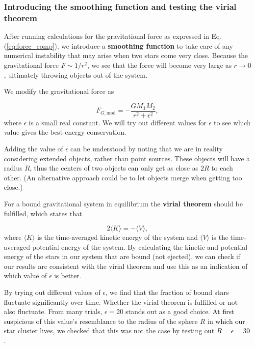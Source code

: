 \documentclass{article}
\begin{document}
\begin{multicols}{2}
\subsubsection{Introducing the smoothing function and testing the virial theorem}

After running calculations for the gravitational force as expressed in Eq. (\ref{eq:force_comp}), we introduce a \textbf{smoothing function} to take care of any numerical instability that may arise when two stars come very close. Because the gravitational force $F \sim 1/r^2$, we see that the force will become very large as $r \rightarrow 0$, ultimately throwing objects out of the system. 

We modify the gravitational force as

\begin{equation}\label{eq:force_mod}
	F_{G,\mathrm{mod}} = - \frac{G M_1 M_2}{r^2 + \epsilon^2},
\end{equation}
where $\epsilon$ is a small real constant. We will try out different values for $\epsilon$ to see which value gives the best energy conservation.

Adding the value of $\epsilon$ can be understood by noting that we are in reality considering extended objects, rather than point sources. These objects will have a radius $R$, thus the centers of two objects can only get as close as $2R$ to each other. (An alternative approach could be to let objects merge when getting too close.) 

For a bound gravitational system in equilibrium the \textbf{virial theorem} should be fulfilled, which states that

\begin{equation}\label{eq:vir}
	2 \langle K \rangle = - \langle V \rangle,
\end{equation}
where $\langle K \rangle$ is the time-averaged kinetic energy of the system and $\langle V \rangle$ is the time-averaged potential energy of the system. By calculating the kinetic and potential energy of the stars in our system that are bound (not ejected), we can check if our results are consistent with the virial theorem and use this as an indication of which value of $\epsilon$ is better.

By trying out different values of $\epsilon$, we find that the fraction of bound stars fluctuate significantly over time. Whether the virial theorem is fulfilled or not also fluctuate. From many trials, $\epsilon = 20$ stands out as a good choice. At first suspicious of this value's resemblance to the radius of the sphere $R$ in which our star cluster lives, we checked that this was not the case by testing out $R = \epsilon = 30$. 


\end{multicols}
\end{document}
